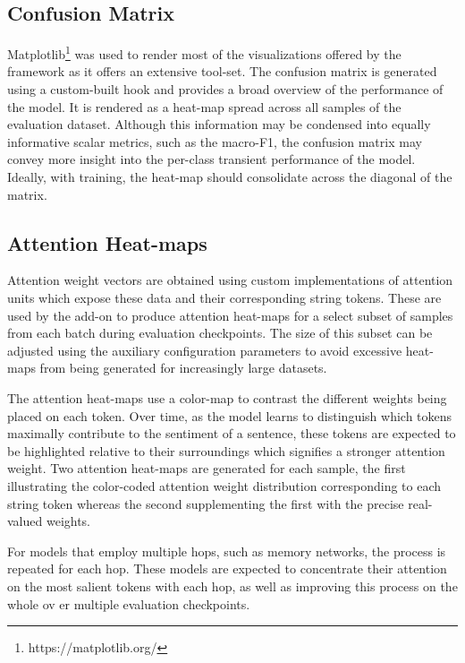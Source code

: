 \documentclass[../../fyp.tex]{subfiles}
\begin{document}
\subsection{Confusion Matrix}
Matplotlib\footnote{https://matplotlib.org/} was used to render most of the visualizations offered by the framework as it offers an extensive tool-set. The confusion matrix is generated using a custom-built hook and provides a broad overview of the performance of the model. It is rendered as a heat-map spread across all samples of the evaluation dataset. Although this information may be condensed into equally informative scalar metrics, such as the macro-F1, the confusion matrix may convey more insight into the per-class transient performance of the model. Ideally, with training, the heat-map should consolidate across the diagonal of the matrix.

\subsection{Attention Heat-maps}
Attention weight vectors are obtained using custom implementations of attention units which expose these data and their corresponding string tokens. These are used by the add-on to produce attention heat-maps for a select subset of samples from each batch during evaluation checkpoints. The size of this subset can be adjusted using the auxiliary configuration parameters to avoid excessive heat-maps from being generated for increasingly large datasets. 

The attention heat-maps use a color-map to contrast the different weights being placed on each token. Over time, as the model learns to distinguish which tokens maximally contribute to the sentiment of a sentence, these tokens are expected to be highlighted relative to their surroundings which signifies a stronger attention weight. Two attention heat-maps are generated for each sample, the first illustrating the color-coded attention weight distribution corresponding to each string token whereas the second supplementing the first with the precise real-valued weights.

For models that employ multiple hops, such as memory networks, the process is repeated for each hop. These models are expected to concentrate their attention on the most salient tokens with each hop, as well as improving this process on the whole ov er multiple evaluation checkpoints.
\end{document}

